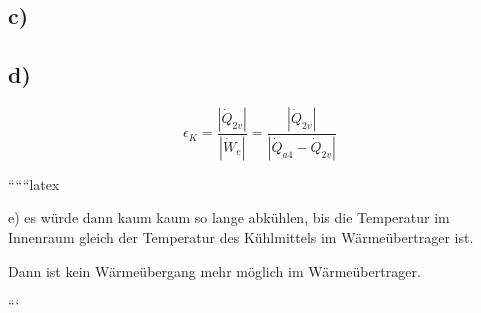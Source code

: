 \subsection*{c)}
\subsection*{d)}
\[
\epsilon_K = \frac{|\dot{Q}_{2v}|}{|\dot{W}_e|} = \frac{|\dot{Q}_{2v}|}{|\dot{Q}_{a4} - \dot{Q}_{2v}|}
\]

``````latex


e) es würde dann kaum kaum so lange abkühlen, bis die Temperatur im Innenraum gleich der Temperatur des Kühlmittels im Wärmeübertrager ist.

Dann ist kein Wärmeübergang mehr möglich im Wärmeübertrager.

```